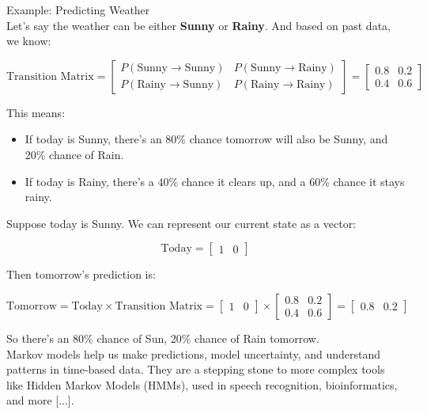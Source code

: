 \documentclass{book}
\begin{document}
Example: Predicting Weather\\

Let’s say the weather can be either \textbf{Sunny} or \textbf{Rainy}. And based on past data, we know:

\[
\text{Transition Matrix} =
\begin{bmatrix}
P(\text{Sunny} \rightarrow \text{Sunny}) & P(\text{Sunny} \rightarrow \text{Rainy}) \\
P(\text{Rainy} \rightarrow \text{Sunny}) & P(\text{Rainy} \rightarrow \text{Rainy})
\end{bmatrix}
=
\begin{bmatrix}
0.8 & 0.2 \\
0.4 & 0.6
\end{bmatrix}
\]

This means:
\begin{itemize}
  \item If today is Sunny, there's an 80\% chance tomorrow will also be Sunny, and 20\% chance of Rain.
  \item If today is Rainy, there's a 40\% chance it clears up, and a 60\% chance it stays rainy.
\end{itemize}

Suppose today is Sunny. We can represent our current state as a vector:

\[
\text{Today} = \begin{bmatrix} 1 & 0 \end{bmatrix}
\]

Then tomorrow’s prediction is:

\[
\text{Tomorrow} = \text{Today} \times \text{Transition Matrix} = 
\begin{bmatrix} 1 & 0 \end{bmatrix} \times
\begin{bmatrix}
0.8 & 0.2 \\
0.4 & 0.6
\end{bmatrix}
=
\begin{bmatrix}
0.8 & 0.2
\end{bmatrix}
\]

So there's an 80\% chance of Sun, 20\% chance of Rain tomorrow.\\

Markov models help us make predictions, model uncertainty, and understand patterns in time-based data. They are a stepping stone to more complex tools like Hidden Markov Models (HMMs), used in speech recognition, bioinformatics, and more [...].\\
\end{document}
